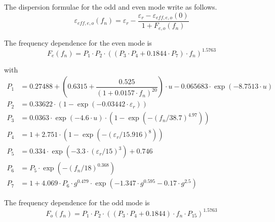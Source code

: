 \addvspace{12pt}

The dispersion formulae for the odd and even mode write as follows.
\begin{equation}
\varepsilon_{eff,e,o}\left(f_n\right) = \varepsilon_r - \dfrac{\varepsilon_r - \varepsilon_{eff,e,o}(0)}{1+F_{e,o}\left(f_n\right)}
\end{equation}

The frequency dependence for the even mode is
\begin{equation}
F_e\left(f_n\right) = P_1\cdot P_2\cdot \left(\left(P_3\cdot P_4 + 0.1844\cdot P_7\right)\cdot f_n\right)^{1.5763}
\end{equation}

with
\begin{align}
P_1 &= 0.27488 + \left( 0.6315 + \dfrac{0.525}{(1+0.0157\cdot f_n)^{20}} \right) \cdot u
     -0.065683\cdot\exp{\left(-8.7513\cdot u\right)}\\
P_2 &= 0.33622\cdot \left(1-\exp{\left(-0.03442\cdot\varepsilon_r\right)}\right)\\
P_3 &= 0.0363\cdot\exp{\left(-4.6\cdot u\right)}\cdot\left( 1-\exp\left(
    -\left( f_n / 38.7\right) ^{4.97} \right) \right)\\
P_4 &= 1 + 2.751\cdot\left( 1-\exp\left( -\left( \varepsilon_r/15.916\right) ^8 \right) \right)\\
P_5 &= 0.334\cdot\exp\left( -3.3\cdot\left( \varepsilon_r/15\right) ^3 \right) + 0.746\\
P_6 &= P_5\cdot\exp\left( -\left( f_n/18\right) ^{0.368} \right)\\
P_7 &= 1 + 4.069\cdot P_6 \cdot g^{0.479}\cdot\exp\left(-1.347\cdot g^{0.595} - 0.17\cdot g^{2.5} \right)
\end{align}

The frequency dependence for the odd mode is
\begin{equation}
F_o\left(f_n\right) = P_1\cdot P_2\cdot \left(\left(P_3\cdot P_4 + 0.1844\right)\cdot f_n\cdot P_{15}\right)^{1.5763}
\end{equation}

